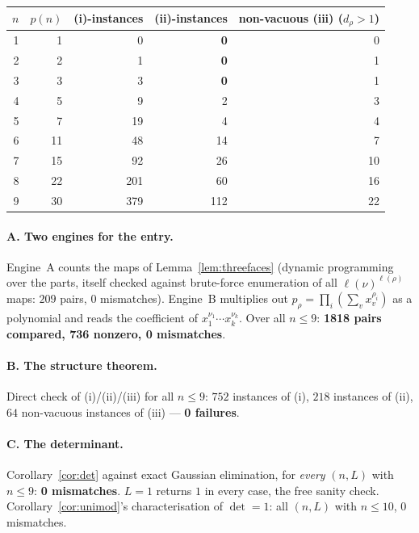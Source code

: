 \documentclass[11pt]{article}
\theoremstyle{definition}
\begin{document}
\begin{center}
\begin{tabular}{rrrrr}
\toprule
$n$ & $p(n)$ & (i)-instances & (ii)-instances & non-vacuous (iii) ($d_\rho>1$)\\
\midrule
1 & 1  & 0   & \textbf{0}   & 0\\
2 & 2  & 1   & \textbf{0}   & 1\\
3 & 3  & 3   & \textbf{0}   & 1\\
4 & 5  & 9   & 2   & 3\\
5 & 7  & 19  & 4   & 4\\
6 & 11 & 48  & 14  & 7\\
7 & 15 & 92  & 26  & 10\\
8 & 22 & 201 & 60  & 16\\
9 & 30 & 379 & 112 & 22\\
\bottomrule
\end{tabular}
\end{center}

\paragraph{A. Two engines for the entry.} Engine~A counts the maps of
Lemma~\ref{lem:threefaces} (dynamic programming over the parts, itself checked against brute-force
enumeration of all $\ell(\nu)^{\ell(\rho)}$ maps: $209$ pairs, $0$ mismatches). Engine~B multiplies
out $p_\rho=\prod_i(\sum_v x_v^{\rho_i})$ as a polynomial and reads the coefficient of
$x_1^{\nu_1}\cdots x_k^{\nu_k}$. Over all $n\le9$: \textbf{1818 pairs compared, 736 nonzero, 0
mismatches}.

\paragraph{B. The structure theorem.} Direct check of (i)/(ii)/(iii) for all $n\le9$: $752$
instances of (i), $218$ instances of (ii), $64$ non-vacuous instances of (iii) --- \textbf{0
failures}.

\paragraph{C. The determinant.} Corollary~\ref{cor:det} against exact Gaussian elimination, for
\emph{every} $(n,L)$ with $n\le9$: \textbf{0 mismatches}. $L=1$ returns $1$ in every case, the free
sanity check. Corollary~\ref{cor:unimod}'s characterisation of $\det=1$: all $(n,L)$ with $n\le10$,
$0$ mismatches.
\end{document}

